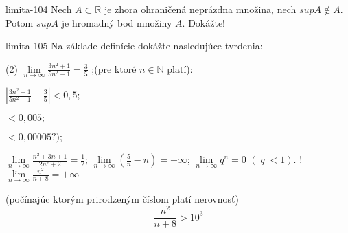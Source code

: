 \begin{defproblem}{limita-104}
Nech $A \subset \mathbb{R}$ je zhora ohraničená neprázdna množina, nech $sup A \notin A$. Potom $sup A$ je hromadný bod množiny $A$. Dokážte!
\end{defproblem}

\begin{defproblem}{limita-105}
Na základe definície dokážte nasledujúce tvrdenia:
\begin{tasks}(2)
    \task*
        $\lim\limits_{n \rightarrow \infty} \frac{3n^2 + 1}{5n^2 - 1} = \frac{3}{5}$
        ;(pre ktoré $n \in \mathbb{N}$ platí):
        \begin{enumerate*}
            \item $|\frac{3n^2 + 1}{5n^2 - 1} - \frac{3}{5} | < 0,5;$
            \item $< 0,005;$
            \item $< 0,00005 ?);$
        \end{enumerate*}

    \task $\lim\limits_{n \rightarrow \infty} \frac{n^2 + 3n + 1}{2n^2 + 2} = \frac{1}{2}$;
    \task $\lim\limits_{n \rightarrow \infty} (\frac{5}{n}-n)=-\infty$;
    \task $\lim\limits_{n \rightarrow \infty} q^n=0$  $(|q|<1).$
    \task! $\lim\limits_{n \rightarrow \infty} \frac{n^2}{n + 8} = +\infty$

        (počínajúc ktorým prirodzeným číslom platí nerovnosť)
        \[ \frac{n^2}{n+8} > 10^3 \]
\end{tasks}


\end{defproblem}
